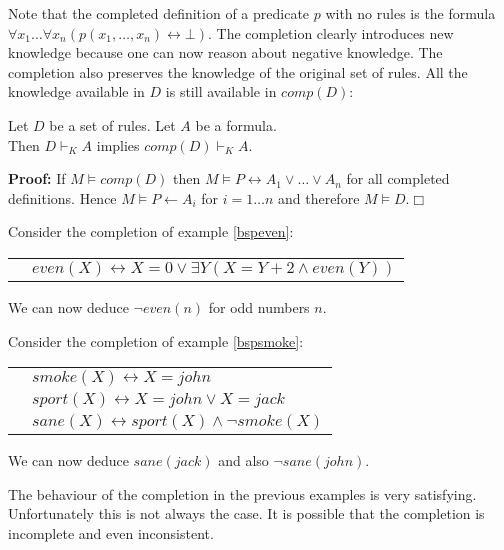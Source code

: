 Note that the completed definition of a predicate $p$ with no rules is the formula $\forall 
x_1 \ldots \forall x_n (p(x_1,\ldots,x_n) \leftrightarrow \bot)$. The completion clearly 
introduces new knowledge because one can now reason about negative knowledge. The completion 
also preserves the knowledge of the original set of rules. All the knowledge available in $D$ is 
still available in $comp(D)$:

\begin{Pro} Let $D$ be a set of rules. Let $A$ be a formula. \\
Then $D \vdash_K A$ implies $comp(D) \vdash_K A$.
\end{Pro}

{\bf Proof:} If $M \models comp(D)$ then $M \models P \leftrightarrow A_1 \vee \ldots 
\vee A_n$ for all completed definitions. Hence $M \models P \leftarrow A_i$ for $i=1\ldots n$
and therefore $M \models D$.\hfill $\Box$

\begin{Bsp} Consider the completion of example \ref{bspeven}:

\begin{tabular}{ll}
\quad & $even(X) \leftrightarrow X=0 \vee \exists Y(X=Y+2 \wedge even(Y))$
\end{tabular}

We can now deduce $\neg even(n)$ for odd numbers $n$.
\end{Bsp}

\begin{Bsp} Consider the completion of example \ref{bspsmoke}:

\begin{tabular}{ll}
\quad & $smoke(X) \leftrightarrow X=john$ \\
\quad & $sport(X) \leftrightarrow X=john \vee X=jack$ \\
\quad & $sane(X) \leftrightarrow sport(X) \wedge \neg smoke(X)$
\end{tabular}

We can now deduce $sane(jack)$ and also $\neg sane(john)$.
\end{Bsp}

The behaviour of the completion in the previous examples is very satisfying. Unfortunately
this is not always the case. It is possible that the completion is incomplete and even 
inconsistent. 

